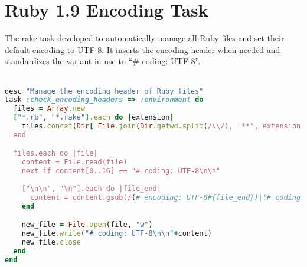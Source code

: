 \chapter{Ruby 1.9 Encoding Task} %
\label{ap:ruby19_encoding_task}

The rake task developed to automatically manage all Ruby files and set their default encoding to UTF-8. It inserts the encoding header when needed and standardizes the variant in use to ``\# coding: UTF-8''.\\\\

\begin{lstlisting}[language=ruby]
desc "Manage the encoding header of Ruby files"
task :check_encoding_headers => :environment do
  files = Array.new
  ["*.rb", "*.rake"].each do |extension|
    files.concat(Dir[ File.join(Dir.getwd.split(/\\/), "**", extension) ])
  end

  files.each do |file|
    content = File.read(file)
    next if content[0..16] == "# coding: UTF-8\n\n"
    
    ["\n\n", "\n"].each do |file_end|
      content = content.gsub(/(# encoding: UTF-8#{file_end})|(# coding: UTF-8#{file_end})|(# -*- coding: UTF-8 -*-#{file_end})/i, "")
    end

    new_file = File.open(file, "w")
    new_file.write("# coding: UTF-8\n\n"+content)
    new_file.close
  end
end

\end{lstlisting}
